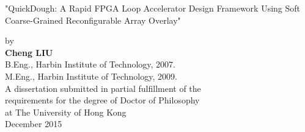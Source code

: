 \begin{center}
\LARGE "QuickDough: A Rapid FPGA Loop Accelerator Design Framework Using Soft Coarse-Grained
Reconfigurable Array Overlay"

\small
\vspace{10mm}
 by \\
\vspace{10mm}
\large \textbf{Cheng LIU} \\
\vspace{5mm}
\small
B.Eng., Harbin Institute of Technology, 2007. \\
\vspace{3mm}
M.Eng., Harbin Institute of Technology, 2009. \\
\vspace{50mm}
\small A dissertation submitted in partial fulfillment of the \\
requirements for the degree of Doctor of Philosophy \\
at The University of Hong Kong \\
\vspace{15mm}
December 2015 \\

\vspace{5mm}
\centering
\end{center}

